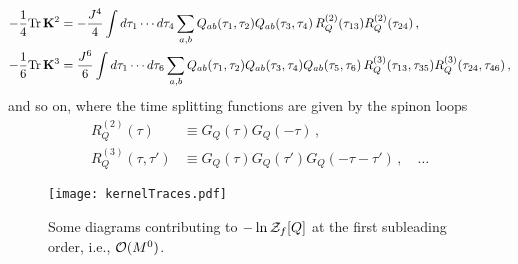 \documentclass[aps,prx,preprint,onecolumn,citeautoscript,superscriptaddress,nofootinbib,
eqsecnum]{revtex4}
\begin{document}
{\begin{equation}
\begin{split}
 -\frac{1}{4} \text{Tr}\, {\bf K}^2 
   &= -\frac{J^4}{4} \int d\tau_1 \cdots d\tau_4 \sum_{a,b} Q_{ab}(\tau_1,\tau_2) Q_{ab}(\tau_3,\tau_4)  \, R_Q^{(2)}(\tau_{13}) R_Q^{(2)}(\tau_{24})\,, \\
 -\frac{1}{6} \text{Tr}\, {\bf K}^3 
   &= \frac{J^6}{6} \int d\tau_1 \cdots d\tau_6 \sum_{a,b} Q_{ab}(\tau_1,\tau_2) Q_{ab}(\tau_3,\tau_4)Q_{ab}(\tau_5,\tau_6)  \, R_Q^{(3)}(\tau_{13},\tau_{35}) R_Q^{(3)}(\tau_{24},\tau_{46})\,,
\end{split}
\end{equation}
and so on, where the time splitting functions are given by the spinon loops
\begin{equation}
\begin{split}
 R_Q^{(2)}(\tau) &\equiv G_Q(\tau) G_Q(-\tau) \,,\\
 R_Q^{(3)}(\tau,\tau') &\equiv G_Q(\tau) G_Q(\tau') G_Q(-\tau-\tau') \,,\quad \ldots
 \end{split}
\end{equation} 
%
\begin{figure}
    \centering
    \texttt{[image: kernelTraces.pdf]}
    \caption{Some diagrams contributing to $-\ln {\cal Z}_f[Q]$ at the first subleading order, i.e., ${\cal O}(M^0)$.}
    \label{fig:diagrams1}
\end{figure}





}
\end{document}
